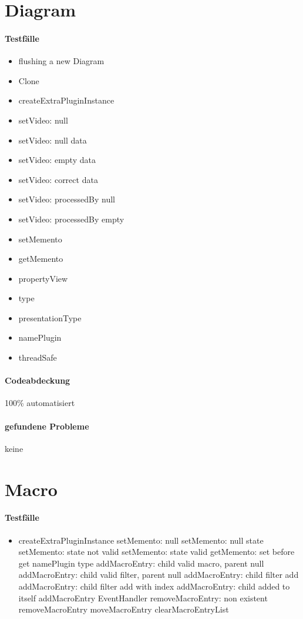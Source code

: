 \section{Diagram}
\paragraph*{Testfälle}
\begin{itemize}
\item flushing a new Diagram
\item Clone
\item createExtraPluginInstance
\item setVideo: null
\item setVideo: null data
\item setVideo: empty data
\item setVideo: correct data
\item setVideo: processedBy null
\item setVideo: processedBy empty
\item setMemento
\item getMemento
\item propertyView
\item type
\item presentationType
\item namePlugin
\item threadSafe
\end{itemize}
\paragraph*{Codeabdeckung}
100\% automatisiert
\paragraph*{gefundene Probleme}
keine



\section{Macro}
\paragraph*{Testfälle}
\begin{itemize}
\item
createExtraPluginInstance
setMemento: null
setMemento: null state
setMemento: state not valid
setMemento: state valid
getMemento: set before get
namePlugin
type
addMacroEntry: child valid macro, parent null
addMacroEntry: child valid filter, parent null
addMacroEntry: child filter add
addMacroEntry: child filter add with index
addMacroEntry: child added to itself
addMacroEntry EventHandler
removeMacroEntry: non existent
removeMacroEntry
moveMacroEntry
clearMacroEntryList
\end{itemize}
